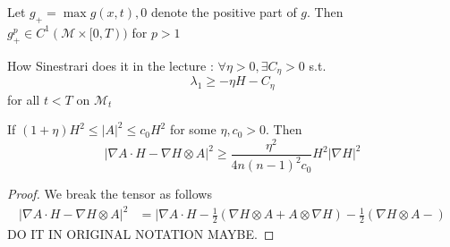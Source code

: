 \begin{comment}
    Also, \begin{align*}
        \nabla g & = \nabla \left[ (|A|^{2}- (1+\eta)H^{2})H^{\sigma -2}\right] \\
        & = (\nabla|A|^{2}- 2(1+\eta)H\nabla H)H^{\sigma -2} + (\sigma -2)(|A|^{2}- (1+\eta)H^{2})H^{\sigma -3}\nabla H \\
        & = (\nabla|A|^{2})H^{\sigma -2} + (\sigma -2)|A|^{2}H^{\sigma -3}\nabla H - \sigma(1+\eta)H^{\sigma -1}\nabla H
    \end{align*}
    which implies \begin{align*}
        \left< \nabla H, \nabla g \right>& = \left< \nabla |A|^{2}, \nabla H \right>H^{\sigma -2} + (\sigma -2)|A|^{2}|\nabla H|^{2}H^{\sigma -3} - \sigma (1+ \eta)|\nabla H|^{2}H^{\sigma -1}
    \end{align*}
\end{proof}
\end{comment}

Let $ g_{+}= \max{g(x,t),0} $ denote the positive part of $ g $. Then $ g_{+}^{p} \in C^{1}( \mathcal{M} \times [0,T)) $ for $ p>1 $
 

\begin{remark}
    How Sinestrari does it in the lecture : $ \forall \eta >0 ,  \exists C_{\eta} >0 $ s.t. 
    \[ \lambda_{1} \ge -\eta H  - C_{\eta} \]
    for all $ t <T $ on $ \mathcal{M}_{t} $
    
\end{remark}

\begin{lemma}
    If $ (1+\eta)H^{2} \le |A|^{2} \le c_{0}H^{2} $ for some $ \eta, c_{0} >0 $. Then 
    \[ |\nabla A \cdot H - \nabla H \otimes A|^{2} \ge \frac{\eta^{2}}{4n(n-1)^{2}c_{0}}H^{2}|\nabla H|^{2} \]
\end{lemma}
\begin{proof}
    We break the tensor as follows \begin{align*}
        | \nabla A \cdot H - \nabla H \otimes A|^{2} & = | \nabla A \cdot H - \frac{1}{2}\left( \nabla H \otimes A + A \otimes \nabla H  \right) - \frac{1}{2}\left( \nabla H \otimes A -  \right)
    \end{align*}
    DO IT IN ORIGINAL NOTATION MAYBE.
\end{proof}

